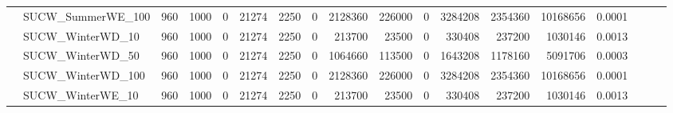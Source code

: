 \begin{landscape}
\begin{longtable}[c]{llrrrrrrrrrrrrrlll}
		& SUCW\_SummerWE\_100          & 960                         & 1000                       & 0                          & 21274                       & 2250                       & 0                          & 2128360                    & 226000                    & 0                         & 3284208                    & 2354360                    & 10168656                       & 0.0001                        &                          &                          &                          \\
		& SUCW\_WinterWD\_10           & 960                         & 1000                       & 0                          & 21274                       & 2250                       & 0                          & 213700                     & 23500                     & 0                         & 330408                     & 237200                     & 1030146                        & 0.0013                        &                          &                          &                          \\
		& SUCW\_WinterWD\_50           & 960                         & 1000                       & 0                          & 21274                       & 2250                       & 0                          & 1064660                    & 113500                    & 0                         & 1643208                    & 1178160                    & 5091706                        & 0.0003                        &                          &                          &                          \\
		& SUCW\_WinterWD\_100          & 960                         & 1000                       & 0                          & 21274                       & 2250                       & 0                          & 2128360                    & 226000                    & 0                         & 3284208                    & 2354360                    & 10168656                       & 0.0001                        &                          &                          &                          \\
		& SUCW\_WinterWE\_10           & 960                         & 1000                       & 0                          & 21274                       & 2250                       & 0                          & 213700                     & 23500                     & 0                         & 330408                     & 237200                     & 1030146                        & 0.0013                        &                          &                          &                          \\

\end{longtable}
\end{landscape}
